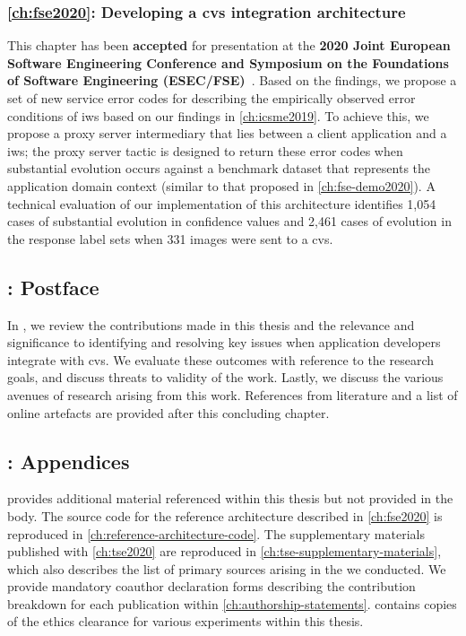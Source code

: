 \subsubsection{\cref{ch:fse2020}: Developing a \gls{cvs} integration architecture} This chapter has been \textbf{accepted} for presentation at the \textbf{2020 Joint European Software Engineering Conference and Symposium on the Foundations of Software Engineering (ESEC/FSE)}~\citep{Cummaudo:2020fse}. Based on the findings, we propose a set of new service error codes for describing the empirically observed error conditions of \gls{iws} based on our findings in \cref{ch:icsme2019}. To achieve this, we propose a proxy server intermediary that lies between a client application and a \gls{iws}; the proxy server tactic is designed to return these error codes when substantial evolution occurs against a benchmark dataset that represents the application domain context (similar to that proposed in \cref{ch:fse-demo2020}). A technical evaluation of our implementation of this architecture identifies 1,054 cases of substantial evolution in confidence values and 2,461 cases of evolution in the response label sets when 331 images were sent to a \gls{cvs}.

\subsection{: Postface}

In , we review the contributions made in this thesis and the relevance and significance to identifying and resolving key issues when application developers integrate with \gls{cvs}. We evaluate these outcomes with reference to the research goals, and discuss threats to validity of the work. Lastly, we discuss the various avenues of research arising from this work. References from literature and a list of online artefacts are provided after this concluding chapter.

\subsection{: Appendices}

 provides additional material referenced within this thesis but not provided in the body. The source code for the reference architecture described in \cref{ch:fse2020} is reproduced in \cref{ch:reference-architecture-code}. The supplementary materials published with \cref{ch:tse2020} are reproduced in \cref{ch:tse-supplementary-materials}, which also describes the list of primary sources arising in the  we conducted.
 We provide mandatory coauthor declaration forms describing the contribution breakdown for each publication within \cref{ch:authorship-statements}.  contains copies of the ethics clearance for various experiments within this thesis. 

